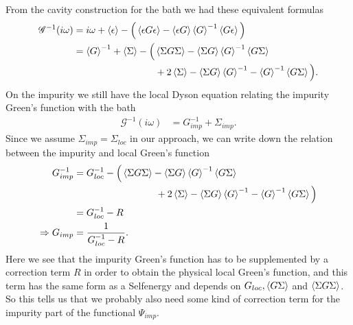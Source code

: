 \documentclass[12pt,a4paper]{scrartcl}
\numberwithin{equation}{section}
\begin{document}
\clearpage

 From the cavity construction for the bath we had these equivalent formulas
 \begin{align}
 \mathscr{G}^{-1}(i\omega) 
 &= i\omega + \braket{\epsilon} - \Big( \braket{ \epsilon G \epsilon } - \braket{\epsilon G} \braket{G}^{-1}  \braket{ G \epsilon }  \Big) \\
%
 &= \braket{G}^{-1} + \braket{\Sigma} 
  - \Big( \braket{\Sigma G \Sigma} - \braket{\Sigma G} \braket{G}^{-1} \braket{G\Sigma} \nonumber \\
     & \hspace{3.0cm} + 2\braket{\Sigma} - \braket{\Sigma G} \braket{G}^{-1} - \braket{G}^{-1}\braket{G\Sigma}\Big) .
 \end{align}
 On the impurity we still have the local Dyson equation relating the  impurity Green's function
 with the bath
 \begin{align}
  \mathscr{G}^{-1}(i\omega) 
  &= G_{imp}^{-1} + \Sigma_{imp}.
 \end{align}
Since we assume $\Sigma_{imp} = \Sigma_{loc}$ in our approach, we can write down the relation between
the impurity and local Green's function
 \begin{align}
  G_{imp}^{-1}
  &= G^{-1}_{loc}
  - \Big( \braket{\Sigma G \Sigma} - \braket{\Sigma G} \braket{G}^{-1} \braket{G\Sigma} \nonumber \\
     & \hspace{3.0cm} + 2\braket{\Sigma} - \braket{\Sigma G} \braket{G}^{-1} - \braket{G}^{-1}\braket{G\Sigma}\Big)  \\
%
&= G^{-1}_{loc} - R \\
%
\Rightarrow G_{imp}
&= \frac{1}{G^{-1}_{loc} - R}.
 \end{align}
 Here we see that the impurity Green's function has to be supplemented by a correction term $R$ in order to obtain the physical
 local Green's function, and this term has the same form as a Selfenergy and depends on
 $G_{loc }, \braket{G\Sigma}$ and $\braket{\Sigma G\Sigma}$.
  So this tells us that we probably also need some kind of correction term for the impurity part of the functional $\Psi_{imp}$.
\end{document}
